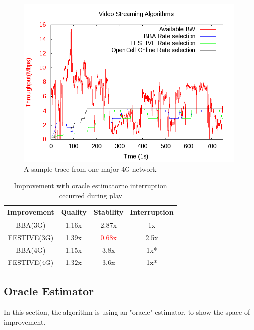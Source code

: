


\begin{figure}[t]
 \includegraphics[width=\linewidth]{pictures/ATT.png}
 \caption{A sample trace from one major 4G network}
\end{figure}

\begin{table}[t]

\begin{tabular} {|c |c |c |c |}
\hline
\textbf{ Improvement} &\textbf{Quality} &\textbf{Stability} & \textbf{Interruption}\\ \hline
BBA(3G)  & 1.16x& 2.87x& 1x \\ \hline
FESTIVE(3G)    & 1.39x & \textcolor{red}{0.68x}&2.5x\\ \hline
BBA(4G) & 1.15x&3.8x& 1x* \\ \hline
FESTIVE(4G) & 1.32x& 3.6x& 1x* \\ \hline
\end{tabular}
\centering
\caption{\large Improvement with oracle estimator\newline \small*no interruption occurred during play} \label{cap:table}
\end{table}



\subsection{Oracle Estimator}\label{sub:oracle}
In this section, the algorithm is using an "oracle" estimator, to show the space of improvement.


